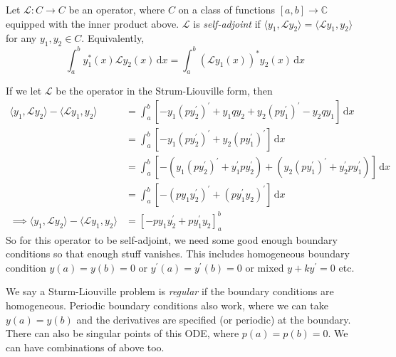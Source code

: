 \documentclass[a4paper]{article}
\begin{document}
\begin{definition}
    Let $\mathcal L:C\to C$ be an operator, where $C$ on a class of functions $[a,b]\to\mathbb C$ equipped with the inner product above.
    $\mathcal L$ is \textit{self-adjoint} if $\langle y_1,\mathcal Ly_2\rangle=\langle\mathcal Ly_1,y_2\rangle$ for any $y_1,y_2\in C$. Equivalently,
    \begin{equation}
        \int_{a}^{b} y_1^*(x)\mathcal{L}y_2(x) \,\mathrm{d}x = \int_{a}^{b} (\mathcal{L}y_1(x))^* y_2(x) \,\mathrm{d}x
    \end{equation}
\end{definition}

If we let $\mathcal L$ be the operator in the Strum-Liouville form, then
\begin{align}
    \langle y_1,\mathcal Ly_2\rangle-\langle\mathcal Ly_1,y_2\rangle&=\int_a^b[-y_1(py_2^\prime)^\prime+y_1qy_2+y_2(py_1^\prime)^\prime-y_2qy_1]\,\mathrm dx\nonumber\\
    &=\int_a^b[-y_1(py_2^\prime)^\prime+y_2(py_1^\prime)^\prime]\,\mathrm dx\nonumber\\
    &=\int_a^b[-(y_1(py_2^\prime)^\prime+y_1^\prime py_2^\prime)+(y_2(py_1^\prime)^\prime+y_2^\prime py_1^\prime)]\,\mathrm dx\nonumber\\
    &=\int_a^b[-(py_1y_2^\prime)^\prime+(py_1^\prime y_2)^\prime]\,\mathrm dx\nonumber\\
    \implies \langle y_1,\mathcal Ly_2\rangle-\langle\mathcal Ly_1,y_2\rangle&=[-py_1y_2^\prime+py_1^\prime y_2]_a^b
\end{align}
So for this operator to be self-adjoint, we need some good enough boundary conditions so that enough stuff vanishes.
This includes homogeneous boundary condition $y(a)=y(b)=0$ or $y^\prime(a)=y^\prime(b)=0$ or mixed $y+ky^\prime=0$ etc.

We say a Sturm-Liouville problem is \textit{regular} if the boundary conditions are homogeneous.
Periodic boundary conditions also work, where we can take $y(a)=y(b)$ and the derivatives are specified (or periodic) at the boundary.
There can also be singular points of this ODE, where $p(a)=p(b)=0$.
We can have combinations of above too.
\end{document}
